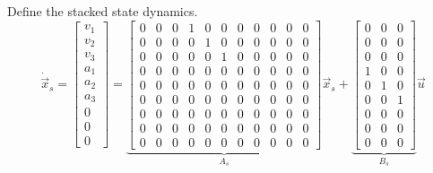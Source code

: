 \documentclass[12pt,onecolumn,reqno]{amsart}
\begin{document}
Define the stacked state dynamics.
\begin{equation}
  \dot{\vec{x}}_{s} = 
  \begin{bmatrix}
    v_{1}             \\
    v_{2}             \\
    v_{3}             \\
    a_{1}             \\
    a_{2}             \\
    a_{3}             \\ 
    0                 \\
    0                 \\
    0
  \end{bmatrix}
  =
  \underbrace{
  \begin{bmatrix}
    0 & 0 & 0 & 1 & 0 & 0 & 0 & 0 & 0 & 0 & 0 \\
    0 & 0 & 0 & 0 & 1 & 0 & 0 & 0 & 0 & 0 & 0 \\
    0 & 0 & 0 & 0 & 0 & 1 & 0 & 0 & 0 & 0 & 0 \\
    0 & 0 & 0 & 0 & 0 & 0 & 0 & 0 & 0 & 0 & 0 \\
    0 & 0 & 0 & 0 & 0 & 0 & 0 & 0 & 0 & 0 & 0 \\
    0 & 0 & 0 & 0 & 0 & 0 & 0 & 0 & 0 & 0 & 0 \\
    0 & 0 & 0 & 0 & 0 & 0 & 0 & 0 & 0 & 0 & 0 \\
    0 & 0 & 0 & 0 & 0 & 0 & 0 & 0 & 0 & 0 & 0 \\
    0 & 0 & 0 & 0 & 0 & 0 & 0 & 0 & 0 & 0 & 0
  \end{bmatrix}
  }_{A_{s}}
  \vec{x}_{s}
  +
  \underbrace{
  \begin{bmatrix}
    0 & 0 & 0 \\
    0 & 0 & 0 \\
    0 & 0 & 0 \\
    1 & 0 & 0 \\
    0 & 1 & 0 \\
    0 & 0 & 1 \\
    0 & 0 & 0 \\
    0 & 0 & 0 \\
    0 & 0 & 0
  \end{bmatrix}
  }_{B_{s}}
  \vec{u}
\end{equation}
\end{document}
